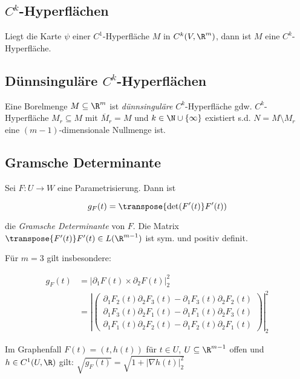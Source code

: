 \subsection*{$C^k$-Hyperflächen}

Liegt die Karte $\psi$ einer $C^1$-Hyperfläche $M$ in $C^k(V,\R^m)$, dann ist $M$ eine $C^k$-Hyperfläche.

\subsection*{Dünnsinguläre $C^k$-Hyperflächen}

Eine Borelmenge $M \subseteq \R^m$ ist \emph{dünnsinguläre} $C^k$-Hyperfläche gdw. $C^k$-Hyperfläche $M_r \subseteq M$ mit $\overline M_r = M$ und $k \in \N \cup \{\infty\}$ existiert s.d. $N = M \setminus M_r$ eine $(m-1)$-dimensionale Nullmenge ist.

\subsection*{Gramsche Determinante}

Sei $F : U \to W$ eine Parametrisierung. Dann ist

\vspace{-2mm}
\[ g_F(t) = \transpose{\det(F'(t)}F'(t)) \]

die \emph{Gramsche Determinante} von $F$. Die Matrix $\transpose{F'(t)}F'(t) \in L(\R^{m-1})$ ist sym. und positiv definit.

\spacing

Für $m = 3$ gilt insbesondere:

\vspace{-4mm}
\begin{align*}
g_F(t) &= |\partial_1F(t) \times \partial_2F(t)|_2^2\\
       &= \left|\begin{pmatrix}
	\partial_1 F_2(t) \partial_2 F_3(t) - \partial_1 F_3(t) \partial_2 F_2(t) \\
	\partial_1 F_3(t) \partial_2 F_1(t) - \partial_1 F_1(t) \partial_2 F_3(t) \\
	\partial_1 F_1(t) \partial_2 F_2(t) - \partial_1 F_2(t) \partial_2 F_1(t)
\end{pmatrix}\right|_2^2
\end{align*}

Im Graphenfall $F(t) = (t,h(t))$ für $t \in U$, $U \subseteq \R^{m-1}$ offen und $h \in C^1(U,\R)$ gilt: $\sqrt{g_F(t)} = \sqrt{1+|\nabla h(t)|_2^2}$


